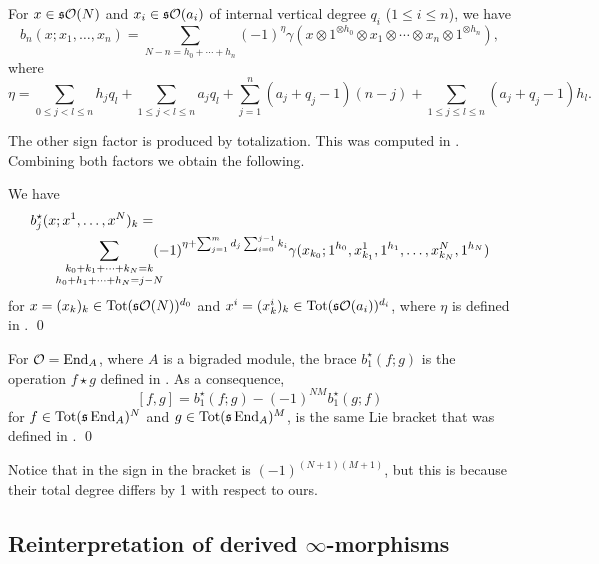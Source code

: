 \documentclass[Thesis.tex]{subfiles}
\begin{document}
 \begin{lem}\label{bigradedsign}
For $x\in \mathfrak{s}{\mathcal O}(N)$ and $x_i\in\mathfrak{s}{\mathcal O}(a_i)$ of internal vertical degree $q_i$ ($1\leq i\leq n$), we have
\[b_n(x;x_1,\dots,x_n)=\sum_{N-n=h_0+\cdots+h_n} (-1)^\eta \gamma
(x\otimes 1^{\otimes h_0}\otimes x_1\otimes \cdots\otimes x_n\otimes1^{\otimes h_n}),\]
where 
\[\eta=\sum_{0\leq j<l\leq n}h_jq_l+\sum_{1\leq j<l\leq n}a_jq_l+\sum_{j=1}^n (a_j+q_j-1)(n-j)+\sum_{1\leq j\leq l\leq n} (a_j+q_j-1)h_l.\]
\end{lem}
The other sign factor is produced by totalization. This was computed in . Combining both factors we obtain the following.

\begin{lem}
We have 
\begin{align}\label{bracetot}
b_j^\star(x;x^1,\dots, x^N)_k=&\\
\underset{\mathclap{h_0+h_1+\cdots+h_N=j-N}}{\sum_{k_0+k_1+\cdots+k_N=k}}&(-1)^{\eta+\sum_{j=1}^m d_j\sum_{i=0}^{j-1}k_i}\gamma(x_{k_0};1^{h_0},x^1_{k_1},1^{h_1},\dots, x^N_{k_N},1^{h_N})\nonumber
\end{align}
for $x=(x_k)_k\in\operatorname{Tot}(\mathfrak{s}{\mathcal O}(N))^{d_0}$ and $x^i=(x^i_k)_k\in\operatorname{Tot}(\mathfrak{s}{\mathcal O}(a_i))^{d_i}$, where $\eta$ is defined in . \qed
\end{lem}

\begin{corollary}\label{biliebracket}
 For ${\mathcal O} = \operatorname{End}_A$, where $A$ is a bigraded module, the brace $b_1^\star(f;g)$ is the operation $f\star g$ defined in \cite{LRW}. As a consequence,
\[
[f,g]=b_1^\star(f;g)-(-1)^{NM}b_1^\star(g;f)
\]
for $f\in\operatorname{Tot}(\mathfrak{s}\operatorname{End}_A)^N$ and $g\in\operatorname{Tot}(\mathfrak{s}\operatorname{End}_A)^M$, is the same Lie bracket that was defined in \cite{LRW}. \qed
\end{corollary}

Notice that in \cite{LRW} the sign in the bracket is $(-1)^{(N+1)(M+1)}$, but this is because their total degree differs by 1 with respect to ours.

\subsection{Reinterpretation of derived $\infty$-morphisms}
\end{document}
